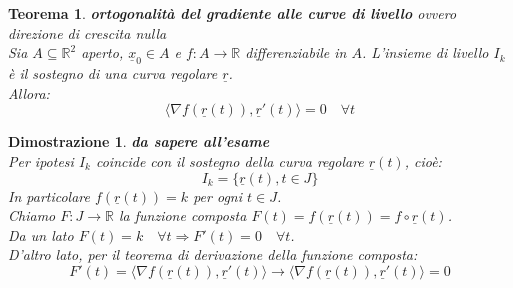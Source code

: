 \documentclass[10pt,landscape, a4paper]{article}
\newtheorem{teorema}{Teorema}
\newenvironment{thm}{\begin{mdframed}[backgroundcolor=white]\begin{teorema}}{\end{teorema}\end{mdframed}}
\newtheorem{demnstrn}{Dimostrazione}
\newenvironment{dimostrazione}{\begin{mdframed}[backgroundcolor=white]\begin{demnstrn}}{\end{demnstrn}\end{mdframed}}
\begin{document}
\begin{multicols}{3}
\begin{thm} \textbf{ortogonalità del gradiente alle curve di livello} ovvero direzione di crescita nulla\\
	Sia $A \subseteq \mathbb{R}^2$ aperto, $\underline{x}_0 \in A$ e $f: A \to \mathbb{R}$ differenziabile in $A$. L'insieme di livello $I_k$ è il sostegno di una curva regolare $\underline{r}$.\\
	Allora:
	\begin{equation}
		\langle \nabla f(\underline{r}(t)), \underline{r}'(t) \rangle = 0 \quad \forall t
	\end{equation}
\end{thm}

\begin{dimostrazione}
	\emph{\textbf{da sapere all'esame}}\\
	Per ipotesi $I_k$ coincide con il sostegno della curva regolare $\underline{r}(t)$, cioè:
	\begin{equation}
		I_k = \{ \underline{r}(t), t \in J \}
	\end{equation}
	In particolare $f(\underline{r}(t)) = k$ per ogni $t \in J$.\\
	Chiamo $F:J\to \mathbb{R}$ la funzione composta $F(t) = f(\underline{r}(t)) = f \circ \underline{r}(t)$.\\
	Da un lato $F(t) = k \quad \forall t \Rightarrow F'(t) = 0 \quad \forall t$.\\
	D'altro lato, per il teorema di derivazione della funzione composta:
	\begin{equation}
		F'(t) = \langle \nabla f(\underline{r}(t)), \underline{r}'(t) \rangle \longrightarrow \langle \nabla f(\underline{r}(t)), \underline{r}'(t) \rangle = 0
	\end{equation}
\end{dimostrazione}






\end{multicols}
\end{document}
